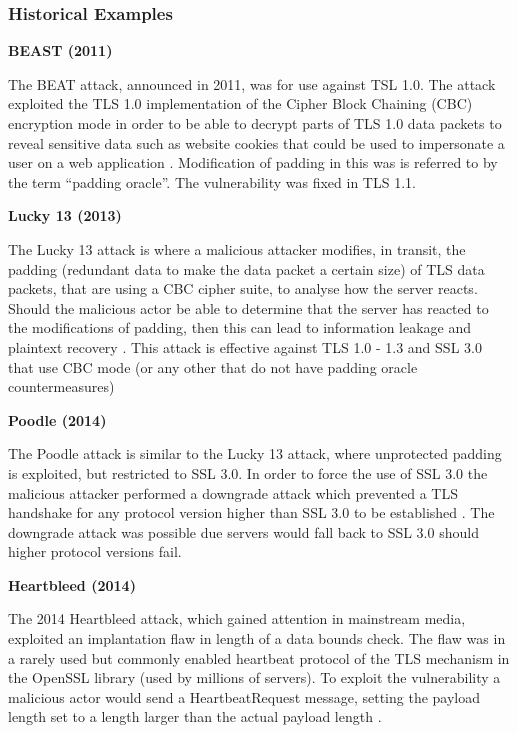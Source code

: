 \documentclass{mscreport}
\begin{document}
\subsubsection{Historical Examples}
\textbf{BEAST (2011)}

\vspace{0.2cm} \noindent
The BEAT attack, announced in 2011, was for use against TSL 1.0. The attack exploited the TLS 1.0 implementation of the Cipher Block Chaining (CBC) encryption mode in order to be able to decrypt parts of TLS 1.0 data packets to reveal sensitive data such as website cookies that could be used to impersonate a user on a web application \cite{Ristic2017-aj,Levillain2015-os}. Modification of padding in this was is referred to by the term “padding oracle”. The vulnerability was fixed in TLS 1.1.

\vspace{0.6cm} \noindent
\textbf{Lucky 13 (2013)}


\vspace{0.2cm} \noindent
The Lucky 13 attack is where a malicious attacker modifies, in transit, the padding (redundant data to make the data packet a certain size) of TLS data packets, that are using a CBC cipher suite, to analyse how the server reacts. Should the malicious actor be able to determine that the server has reacted to the modifications of padding, then this can lead to information leakage and plaintext recovery \cite{Ristic2017-aj,Al_Fardan2013-sw}. This attack is effective against TLS 1.0 - 1.3 and SSL 3.0 that use CBC mode (or any other that do not have padding oracle countermeasures)

\vspace{0.6cm} \noindent
\textbf{Poodle (2014)}


\vspace{0.2cm} \noindent
The Poodle attack is similar to the Lucky 13 attack, where unprotected padding is exploited, but restricted to SSL 3.0. In order to force the use of SSL 3.0 the malicious attacker performed a downgrade attack which prevented a TLS handshake for any protocol version higher than SSL 3.0 to be established \cite{Ristic2017-aj,Al_Fardan2013-sw}. The downgrade attack was possible due servers would fall back to SSL 3.0 should higher protocol versions fail.

\vspace{0.6cm} \noindent
\textbf{Heartbleed (2014)}


\vspace{0.2cm} \noindent
The 2014 Heartbleed attack, which gained attention in mainstream media, exploited an implantation flaw in length of a data bounds check. The flaw was in a rarely used but commonly enabled heartbeat protocol \cite{Durumeric2014-yj} of the TLS mechanism in the OpenSSL library (used by millions of servers). To exploit the vulnerability a malicious actor would send a HeartbeatRequest message, setting the payload length set to a length larger than the actual payload length \cite{Durumeric2014-yj}.
\end{document}
